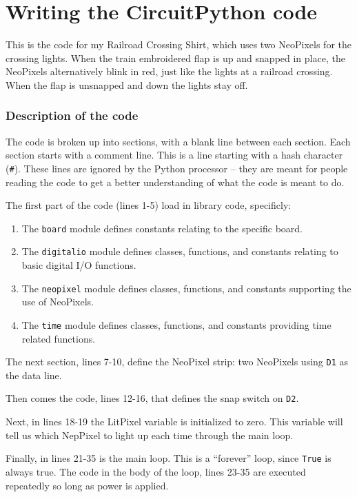 \documentclass[letterpaper,twoside,12pt]{article}
\begin{document}
\part{Writing the CircuitPython code}

This is the code for my Railroad Crossing Shirt, which uses two NeoPixels for 
the crossing lights.  When the train embroidered flap is up and snapped in 
place, the NeoPixels alternatively blink in red, just like the lights at a 
railroad crossing.  When the flap is unsnapped and down the lights stay off.
\section{Description of the code}

The code is broken up into sections, with a blank line between each section.
Each section starts with a comment line. This is a line starting with a hash
character (\texttt{\#}). These lines are ignored by the Python processor -- they
are meant for people reading the code to get a better understanding of what
the code is meant to do.

The first part of the code (lines 1-5) load in library code, specificly:
\begin{enumerate}
\item The \texttt{board} module defines constants relating to the specific 
board.
\item The \texttt{digitalio} module defines classes, functions, and constants 
relating to basic digital I/O functions.
\item The \texttt{neopixel} module defines classes, functions, and constants 
supporting the use of NeoPixels.
\item The \texttt{time} module defines classes, functions, and constants 
providing time related functions.
\end{enumerate}

The next section, lines 7-10, define the NeoPixel strip: two NeoPixels using 
\texttt{D1} as the data line.

Then comes the code, lines 12-16, that defines the snap switch on \texttt{D2}.

Next, in lines 18-19 the LitPixel variable is initialized to zero. This
variable will tell us which NepPixel to light up each time through the main
loop.

Finally, in lines 21-35 is the main loop. This is a ``forever'' loop, since
\texttt{True} is always true. The code in the body of the loop, lines 23-35
are executed repeatedly so long as power is applied.
\end{document}

